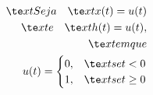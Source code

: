 \documentclass[preview]{standalone}
\begin{document}
\begin{align*}
\te x t{Seja } \quad  \te x t{ x (t)} = u(t) \\ \te x t{ e } \quad  \te x t{ h (t)} = u(t),\\ \te x t{ em que } \\ u(t) = \begin{cases} 0, & \te x t{se } t < 0 \\ 1, & \te x t{se } t \geq 0 \end{cases}
\end{align*}
\end{document}
